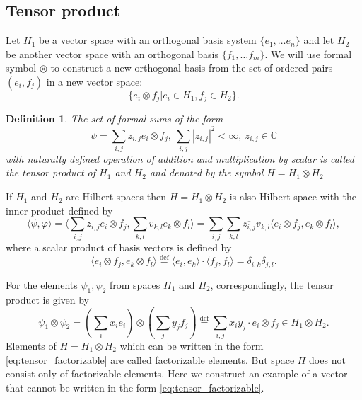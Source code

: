 \documentclass[11pt]{article}
\newtheorem{definition}{Definition}[section]
\begin{document}
\subsection{Tensor product}
Let $H_1$ be a vector space with an orthogonal basis system $\{e_1, \ldots e_n\}$ and let $H_2$ be another vector space with an orthogonal basis $\{f_1,\ldots f_m\}$. We will use formal symbol $\otimes$ to construct a new orthogonal basis from the set of ordered pairs $(e_i, f_j)$ in a new vector space:
\begin{equation}
\{e_i \otimes f_j | e_i \in H_1, f_j \in H_2\}. \label{eq:tensor_basis}
\end{equation}

\begin{definition}
The set of formal sums of the form
\begin{equation}
\psi = \sum_{i,j}z_{i,j}e_i\otimes f_j,\ \sum_{i, j}|z_{i,j}|^2 < \infty,\  z_{i,j} \in \mathbb{C}
\label{eq:tensor_element}
\end{equation}
with naturally defined operation of addition and multiplication by scalar is called the tensor product of $H_1$ and $H_2$ and denoted by the symbol $H = H_1\otimes H_2$
\end{definition}

If $H_1$ and $H_2$ are Hilbert spaces then $H = H_1\otimes H_2$ is also Hilbert space with the inner product defined by
\[
\langle\psi, \varphi\rangle = \langle \sum_{i,j}z_{i,j}e_i\otimes f_j, \sum_{k,l}v_{k,l}e_k\otimes f_l \rangle = \sum_{i, j}\sum_{k, l}\overline{z_{i,j}}v_{k,l} \langle e_i\otimes f_j, e_k\otimes f_l \rangle,
\]
where a scalar product of basis vectors is defined by
\[
\langle e_i\otimes f_j, e_k\otimes f_l \rangle \overset{\mbox{def}}= \langle e_i, e_k\rangle \cdot \langle f_j, f_l \rangle = \delta_{i, k}\delta_{j, l}.
\]

For the elements $\psi_1, \psi_2$ from spaces $H_1$ and $H_2$, correspondingly, the tensor product is given by
\begin{equation}
\psi_1 \otimes \psi_2 = \left(\sum_ix_ie_i\right) \otimes \left(\sum_jy_jf_j\right) \overset{\mbox{def}}= \sum_{i, j} x_iy_j \cdot e_i \otimes f_j \in H_1 \otimes H_2.
\label{eq:tensor_factorizable}
\end{equation}
Elements of $H = H_1\otimes H_2$ which can be written in the form \eqref{eq:tensor_factorizable} are called factorizable elements. But space $H$ does not consist only of factorizable elements. Here we construct an example of a vector that cannot be written in the form  \eqref{eq:tensor_factorizable}.
\end{document}

